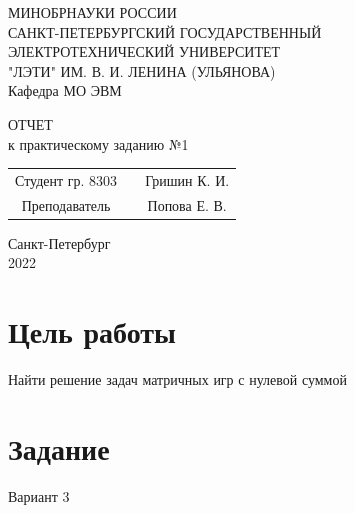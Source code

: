 \documentclass[12pt,a4paper]{article}%
\begin{document}
\begin{titlepage}
  \begin{center}
    МИНОБРНАУКИ РОССИИ\\
    САНКТ-ПЕТЕРБУРГСКИЙ ГОСУДАРСТВЕННЫЙ\\
    ЭЛЕКТРОТЕХНИЧЕСКИЙ УНИВЕРСИТЕТ\\
    "ЛЭТИ" ИМ. В. И. ЛЕНИНА (УЛЬЯНОВА)\\
    Кафедра МО ЭВМ

    \vspace{4cm}

    ОТЧЕТ\\
    к практическому заданию №1
    \vfill

    \begin{tabular}{ c c c }
      Студент гр. 8303 & \uline{\hspace{3cm}} & Гришин К. И. \\[1cm]
      Преподаватель    & \uline{\hspace{3cm}} & Попова Е. В. \\
    \end{tabular}
    
    \vfill
    Санкт-Петербург\\
    2022
  \end{center}
\end{titlepage}


\section{Цель работы}
Найти решение задач матричных игр с нулевой суммой

\section{Задание}
Вариант 3
\end{document}
